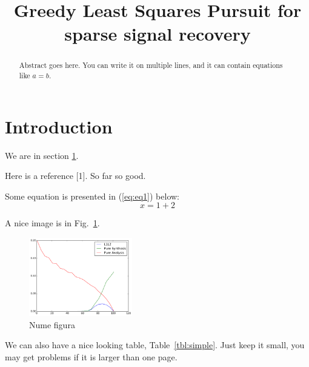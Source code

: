 \documentclass[conference,a4paper]{IEEEtran}
\begin{document}
\title{Greedy Least Squares Pursuit for sparse signal recovery}


\author{
}

\maketitle

\begin{abstract}
Abstract goes here. You can write it on multiple lines, and it can
contain equations like \(a = b\).
\end{abstract}

\IEEEpeerreviewmaketitle


\section{Introduction}\label{sec:intro}

We are in section \ref{sec:intro}.

Here is a reference {[}1{]}. So far so good.

Some equation is presented in (\ref{eq:eq1}) below:
\begin{equation}x = 1 + 2\label{eq:eq1}\end{equation}

A nice image is in Fig.~\ref{fig:test}.

\begin{figure}
\centering
\includegraphics[width=0.40000\textwidth]{Figure.pdf}
\caption{Nume figura}\label{fig:test}
\end{figure}

We can also have a nice looking table, Table~\ref{tbl:simple}. Just keep
it small, you may get problems if it is larger than one page.
\end{document}
